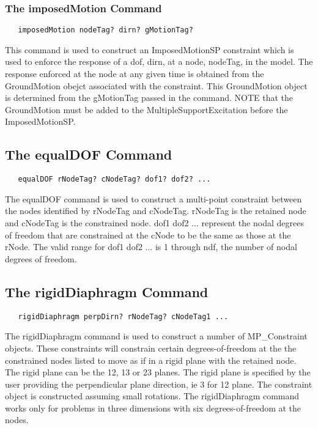 \documentclass[12pt]{article}
\begin{document}
\subsubsection{The imposedMotion Command}
{\sf\small
\begin{verbatim}
   imposedMotion nodeTag? dirn? gMotionTag? 
\end{verbatim}
}

This command is used to construct an ImposedMotionSP constraint which
is used to enforce the response of a dof, dirn, at a node, nodeTag, in
the model. The response enforced at the node at any given time is
obtained from the GroundMotion obejct associated with the
constraint. This GroundMotion object is determined from the gMotionTag
passed in the command. NOTE that the GroundMotion must be added to the
MultipleSupportExcitation before the ImposedMotionSP. 


\subsection{The equalDOF Command}
{\sf\small
\begin{verbatim}
   equalDOF rNodeTag? cNodeTag? dof1? dof2? ...
\end{verbatim}
}

The equalDOF command is used to construct a multi-point constraint between
the nodes identified by rNodeTag and cNodeTag. rNodeTag is the retained node
and cNodeTag is the constrained node. dof1 dof2 ... 
represent the nodal degrees of freedom that are constrained at the cNode to
be the same as those at the rNode. The valid range for dof1 dof2 ... is 1
through ndf, the number of nodal degrees of freedom.

\subsection{The rigidDiaphragm Command}
{\sf\small
\begin{verbatim}
   rigidDiaphragm perpDirn? rNodeTag? cNodeTag1 ...
\end{verbatim}
}

The rigidDiaphragm command is used to construct a number of
MP\_Constraint objects. These constraints will constrain certain
degrees-of-freedom at the the constrained nodes listed to move as if in a
rigid plane with the retained node. The rigid plane can be the 12, 13 or
23 planes. The rigid plane is specified by the user providing the
perpendicular plane direction, ie 3 for 12 plane. The constraint
object is constructed assuming small rotations. The rigidDiaphragm
command works only for problems in three dimensions with six
degrees-of-freedom at the nodes. 
\end{document}
